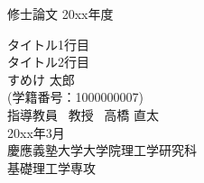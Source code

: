 \documentclass[../main]{subfiles}
\begin{document}
\begin{titlepage}
    {\LARGE 修士論文} \hspace{\fill} {\LARGE 20xx年度}
    \vspace{2cm}
    \begin{center}
        {\huge タイトル1行目\\タイトル2行目} \\
        \vspace{2cm}
        {\Huge すめけ 太郎} \\
        \vspace{0.5cm}
        {\LARGE (学籍番号：1000000007)} \\
        \vspace{5cm}
        {\LARGE 指導教員\,\,\,  教授\,\,\,  高橋 直太} \\
        \vspace{3cm}
        {\LARGE 20xx年3月} \\
        \vspace{1cm}
        {\LARGE 慶應義塾大学大学院理工学研究科} \\
        {\LARGE 基礎理工学専攻} \\
    \end{center}
\end{titlepage}
\end{document}
